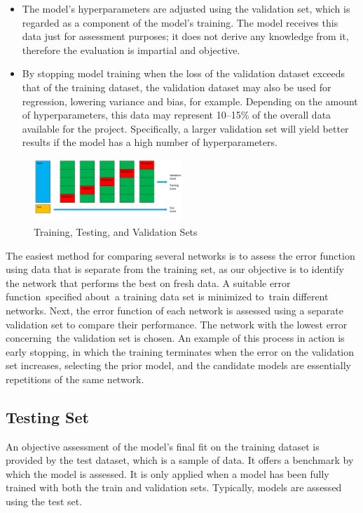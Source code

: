 \begin{itemize}
    \item  The model's hyperparameters are adjusted using the validation set, which is regarded as a component of the model's training. The model receives this data just for assessment purposes; it does not derive any knowledge from it, therefore the evaluation is impartial and objective. 
    \item By stopping model training when the loss of the validation dataset exceeds that of the training dataset, the validation dataset may also be used for regression, lowering variance and bias, for example. Depending on the amount of hyperparameters, this data may represent 10–15\% of the overall data available for the project. Specifically, a larger validation set will yield better results if the model has a high number of hyperparameters. 
\end{itemize}

\begin{figure}[h]
    \centering
    \includegraphics[width=0.5\textwidth]{images/val_set.png}
    \caption{Training, Testing, and Validation Sets}
    \end{figure}

The easiest method for comparing several networks is to assess the error function using data that is separate from the training set, as our objective is to identify the network that performs the best on fresh data. A suitable error function specified about a training data set is minimized to train different networks. Next, the error function of each network is assessed using a separate validation set to compare their performance. The network with the lowest error concerning the validation set is chosen. An example of this process in action is early stopping, in which the training terminates when the error on the validation set increases, selecting the prior model, and the candidate models are essentially repetitions of the same network.


\subsection{Testing Set}

An objective assessment of the model's final fit on the training dataset is provided by the test dataset, which is a sample of data. It offers a benchmark by which the model is assessed. It is only applied when a model has been fully trained with both the train and validation sets. Typically, models are assessed using the test set.


